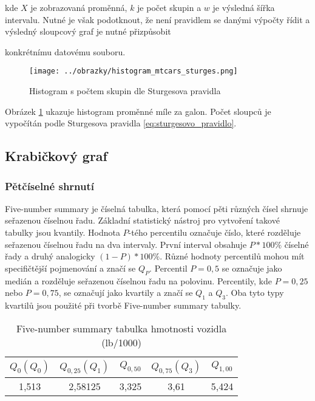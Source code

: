 kde $X$ je zobrazovaná proměnná, $k$ je počet skupin a $w$ je výsledná šířka intervalu. 
Nutné je však podotknout, že není pravidlem se danými výpočty řídit a výsledný
sloupcový graf je nutné přizpůsobit

konkrétnímu datovému souboru.

\begin{figure}[H]
    \centering
    \texttt{[image: ../obrazky/histogram\_mtcars\_sturges.png]}
    \caption{Histogram s počtem skupin dle Sturgesova pravidla} 
    \label{fig:histogram_mtcars_sturges}
\end{figure}

Obrázek \ref{fig:histogram_mtcars_sturges} ukazuje histogram proměnné míle za galon. Počet sloupců je vypočítán podle Sturgesova pravidla \ref{eq:sturgesovo_pravidlo}. 

\subsection{Krabičkový graf}
\subsubsection{Pětčíselné shrnutí}
Five-number summary je číselná tabulka, která pomocí pěti různých čísel shrnuje seřazenou číselnou řadu. Základní statistický nástroj pro
vytvoření takové tabulky jsou kvantily. Hodnota $P$-tého percentilu označuje číslo, které rozděluje seřazenou číselnou řadu na dva intervaly. 
První interval obsahuje $P*100\%$ číselné řady a druhý analogicky $(1-P)*100\%$. Různé hodnoty percentilů mohou mít specifičtější pojmenování a značí se $Q_P$.
Percentil $P = 0,5$ se označuje jako medián a rozděluje seřazenou číselnou řadu na polovinu. Percentily, kde $P = 0,25$ nebo $P = 0,75$, se označují
jako kvartily a značí se $Q_{1}$ a $Q_{3}$. Oba tyto typy kvartilů jsou použité při tvorbě Five-number summary tabulky.

\begin{table}[H]
    \centering
    \begin{tabular}[t]{c|c|c|c|c}
        \hline
        $Q_{0} (Q_0)$ & $Q_{0,25} (Q_1) $ & $Q_{0,50}$ & $Q_{0,75} (Q_3)$ & $Q_{1,00}$\\
        \hline
        1,513 & 2,58125 & 3,325 & 3,61 & 5,424\\
        \hline
    \end{tabular}
    \caption{\label{tab:five-number_summary}Five-number summary tabulka hmotnosti vozidla (lb/1000)}
\end{table}


